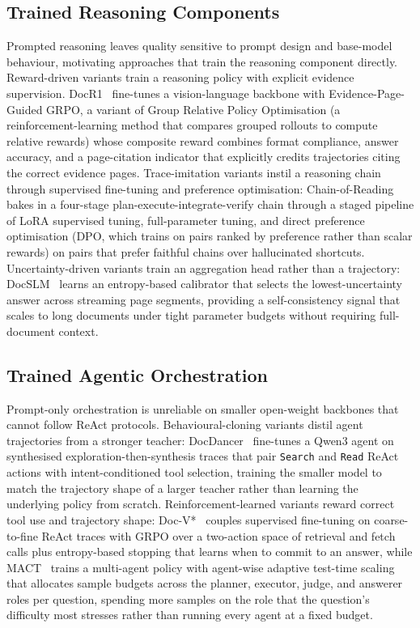 \documentclass[11pt]{article}
\begin{document}
\subsection{Trained Reasoning Components}
\label{sec:train-reasoning}

Prompted reasoning leaves quality sensitive to prompt design and base-model behaviour, motivating approaches that train the reasoning component directly. Reward-driven variants train a reasoning policy with explicit evidence supervision. DocR1~\cite{xiong2026docr1} fine-tunes a vision-language backbone with Evidence-Page-Guided GRPO, a variant of Group Relative Policy Optimisation (a reinforcement-learning method that compares grouped rollouts to compute relative rewards) whose composite reward combines format compliance, answer accuracy, and a page-citation indicator that explicitly credits trajectories citing the correct evidence pages. Trace-imitation variants instil a reasoning chain through supervised fine-tuning and preference optimisation: Chain-of-Reading~\cite{guo2026endtoend} bakes in a four-stage plan-execute-integrate-verify chain through a staged pipeline of LoRA supervised tuning, full-parameter tuning, and direct preference optimisation (DPO, which trains on pairs ranked by preference rather than scalar rewards) on pairs that prefer faithful chains over hallucinated shortcuts. Uncertainty-driven variants train an aggregation head rather than a trajectory: DocSLM~\cite{hannan2025docslm} learns an entropy-based calibrator that selects the lowest-uncertainty answer across streaming page segments, providing a self-consistency signal that scales to long documents under tight parameter budgets without requiring full-document context.

\subsection{Trained Agentic Orchestration}
\label{sec:train-orchestration}

Prompt-only orchestration is unreliable on smaller open-weight backbones that cannot follow ReAct protocols. Behavioural-cloning variants distil agent trajectories from a stronger teacher: DocDancer~\cite{zhang2026docdancer} fine-tunes a Qwen3 agent on synthesised exploration-then-synthesis traces that pair \texttt{Search} and \texttt{Read} ReAct actions with intent-conditioned tool selection, training the smaller model to match the trajectory shape of a larger teacher rather than learning the underlying policy from scratch. Reinforcement-learned variants reward correct tool use and trajectory shape: Doc-V*~\cite{zheng2026docv} couples supervised fine-tuning on coarse-to-fine ReAct traces with GRPO over a two-action space of retrieval and fetch calls plus entropy-based stopping that learns when to commit to an answer, while MACT~\cite{yu2025mact} trains a multi-agent policy with agent-wise adaptive test-time scaling that allocates sample budgets across the planner, executor, judge, and answerer roles per question, spending more samples on the role that the question's difficulty most stresses rather than running every agent at a fixed budget.
\end{document}
